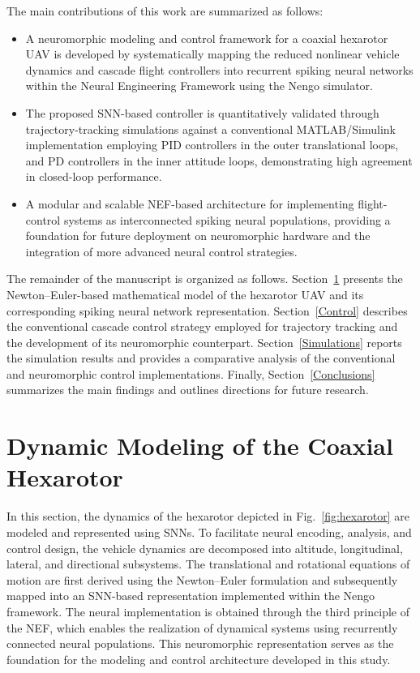 \documentclass[conference]{IEEEtran}
\begin{document}
The main contributions of this work are summarized as follows:
\begin{itemize}
    \item A neuromorphic modeling and control framework for a coaxial hexarotor UAV is developed by systematically mapping the reduced nonlinear vehicle dynamics and cascade flight controllers into recurrent spiking neural networks within the Neural Engineering Framework using the Nengo simulator.
    \item The proposed SNN-based controller is quantitatively validated through trajectory-tracking simulations against a conventional MATLAB/Simulink implementation employing PID controllers in the outer translational loops, and PD controllers in the inner attitude loops, demonstrating high agreement in closed-loop performance.
    \item A modular and scalable NEF-based architecture for implementing flight-control systems as interconnected spiking neural populations, providing a foundation for future deployment on neuromorphic hardware and the integration of more advanced neural control strategies.
\end{itemize}

The remainder of the manuscript is organized as follows.
Section~\ref{Modeling} presents the Newton--Euler-based mathematical
model of the hexarotor UAV and its corresponding spiking neural
network representation. Section~\ref{Control} describes the
conventional cascade control strategy employed for trajectory tracking
and the development of its neuromorphic counterpart.
Section~\ref{Simulations} reports the simulation results and provides a
comparative analysis of the conventional and neuromorphic control
implementations. Finally, Section~\ref{Conclusions} summarizes the main
findings and outlines directions for future research.

\section{Dynamic Modeling of the Coaxial Hexarotor}\label{Modeling}

In this section, the dynamics of the hexarotor depicted in Fig.~\ref{fig:hexarotor} are modeled and represented using SNNs. To facilitate neural encoding, analysis, and control design, the vehicle dynamics are decomposed into altitude, longitudinal, lateral, and directional subsystems. The translational and rotational equations of motion are first derived using the Newton–Euler formulation and subsequently mapped into an SNN-based representation implemented within the Nengo framework. The neural implementation is obtained through the third principle of the NEF, which enables the realization of dynamical systems using recurrently connected neural populations. This neuromorphic representation serves as the foundation for the modeling and control architecture developed in this study.
\end{document}
